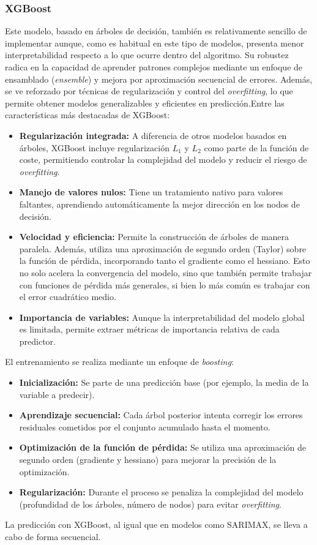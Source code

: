 \subsubsection{XGBoost}
%
%
%
Este modelo, basado en árboles de decisión, también es relativamente sencillo de implementar aunque, como es habitual en este tipo de modelos, presenta menor interpretabilidad respecto a lo que ocurre dentro del algoritmo. Su robustez radica en la capacidad de aprender patrones complejos mediante un enfoque de ensamblado (\textit{ensemble}) y mejora por aproximación secuencial de errores. Además, se ve reforzado por técnicas de regularización y control del \textit{overfitting}, lo que permite obtener modelos generalizables y eficientes en predicción.Entre las características más destacadas de XGBoost:

\begin{itemize}
    \item \textbf{Regularización integrada:} A diferencia de otros modelos basados en árboles, XGBoost incluye regularización $L_1$ y $L_2$ como parte de la función de coste, permitiendo controlar la complejidad del modelo y reducir el riesgo de \textit{overfitting}.
    \item \textbf{Manejo de valores nulos:} Tiene un tratamiento nativo para valores faltantes, aprendiendo automáticamente la mejor dirección en los nodos de decisión.
    \item \textbf{Velocidad y eficiencia:} Permite la construcción de árboles de manera paralela. Además, utiliza una aproximación de segundo orden (Taylor) sobre la función de pérdida, incorporando tanto el gradiente como el hessiano. Esto no solo acelera la convergencia del modelo, sino que también permite trabajar con funciones de pérdida más generales, si bien lo más común es trabajar con el error cuadrático medio.
    \item \textbf{Importancia de variables:} Aunque la interpretabilidad del modelo global es limitada, permite extraer métricas de importancia relativa de cada predictor.
\end{itemize}

El entrenamiento se realiza mediante un enfoque de \textit{boosting}:

\begin{itemize}
    \item \textbf{Inicialización:} Se parte de una predicción base (por ejemplo, la media de la variable a predecir).
    \item \textbf{Aprendizaje secuencial:} Cada árbol posterior intenta corregir los errores residuales cometidos por el conjunto acumulado hasta el momento.
    \item \textbf{Optimización de la función de pérdida:} Se utiliza una aproximación de segundo orden (gradiente y hessiano) para mejorar la precisión de la optimización.
    \item \textbf{Regularización:} Durante el proceso se penaliza la complejidad del modelo (profundidad de los árboles, número de nodos) para evitar \textit{overfitting}.
\end{itemize}
La predicción con XGBoost, al igual que en modelos como SARIMAX, se lleva a cabo de forma secuencial.

